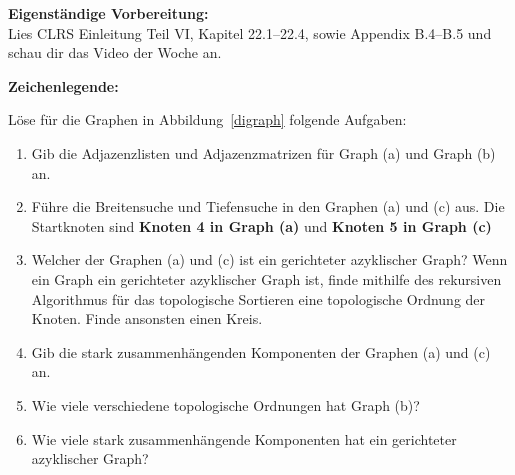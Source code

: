 \documentclass{uebung_cs}
\begin{document}
\textbf{Eigenständige Vorbereitung:}\\
Lies  CLRS Einleitung Teil VI, Kapitel 22.1--22.4, sowie Appendix B.4--B.5 und schau dir das  Video der Woche an.

\textbf{Zeichenlegende:}
\legende{}


\begin{aufgabe}
	Löse für die Graphen in Abbildung~\ref{digraph} folgende Aufgaben:
	\begin{enumerate}
		\item %
    Gib die Adjazenzlisten und Adjazenzmatrizen für Graph (a) und Graph (b) an.
		\item %
    Führe die Breitensuche und Tiefensuche in den Graphen (a) und (c) aus.
		Die Startknoten sind \textbf{Knoten 4 in Graph (a)} und \textbf{Knoten 5 in Graph (c)}
		\item Welcher der Graphen (a) und (c) ist ein gerichteter azyklischer Graph?
		Wenn ein Graph ein gerichteter azyklischer Graph ist, finde mithilfe des rekursiven Algorithmus für das topologische Sortieren eine topologische Ordnung der Knoten.
		Finde ansonsten einen Kreis.
		\item Gib die stark zusammenhängenden Komponenten der Graphen (a) und (c) an.
		\item Wie viele verschiedene topologische Ordnungen hat Graph (b)?
		\item Wie viele stark zusammenhängende Komponenten hat ein gerichteter azyklischer Graph?
	\end{enumerate}
\end{aufgabe}
\end{document}
